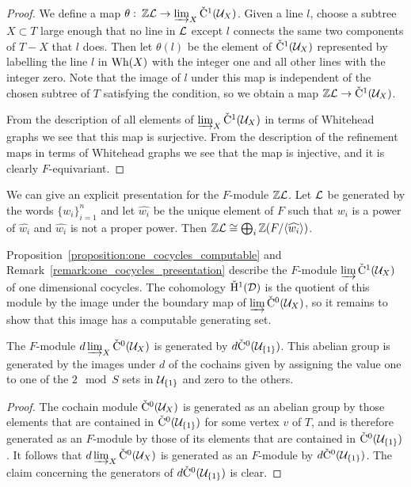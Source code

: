 \begin{proof}
  We define a map $\theta \operatorname{\colon}\mathbb{Z}\mathcal{L} \to \varinjlim_X\check{\mathrm{C}}{}^1(\mathcal{U}_X)$.
  Given a line $l$, choose a subtree $X\subset T$ large enough that no line in $\mathcal{L}$ except $l$ connects the same two components of $T - X$ that $l$ does.
  Then let $\theta(l)$ be the element of $\check{\mathrm{C}}{}^1(\mathcal{U}_X)$ represented by labelling the line $l$ in $\mathrm{Wh}(X)$ with the integer one and all other lines with the integer zero.
  Note that the image of $l$ under this map is independent of the chosen subtree of $T$ satisfying the condition, so we obtain a map $\mathbb{Z}\mathcal{L}\to\check{\mathrm{C}}{}^1(\mathcal{U}_X)$.

  From the description of all elements of $\varinjlim_X\check{\mathrm{C}}{}^1(\mathcal{U}_X)$ in terms of Whitehead graphs we see that this map is surjective.
  From the description of the refinement maps in terms of Whitehead graphs we see that the map is injective, and it is clearly $F$-equivariant.
\end{proof}

\begin{remark}\label{remark:one_cocycles_presentation}
  We can give an explicit presentation for the $F$-module $\mathbb{Z}\mathcal{L}$.
  Let $\mathcal{L}$ be generated by the words $\{w_i\}_{i=1}^n$ and let $\widehat{w_i}$ be the unique element of $F$ such that $w_i$ is a power of $\widehat{w_i}$ and $\widehat{w_i}$ is not a proper power.
  Then $\mathbb{Z}\mathcal{L} \cong \bigoplus_i \mathbb{Z} (F/ \langle \widehat{w_i}\rangle)$.
\end{remark}

Proposition~\ref{proposition:one_cocycles_computable} and Remark~\ref{remark:one_cocycles_presentation} describe the $F$-module $\varinjlim\check{\mathrm{C}}{}^1 (\mathcal{U}_X)$ of one dimensional cocycles.
The cohomology $\check{\mathrm{H}}{}^1( \mathcal{D})$ is the quotient of this module by the image under the boundary map of $\varinjlim\check{\mathrm{C}}{}^0(\mathcal{U}_X)$, so it remains to show that this image has a computable generating set.

\begin{lemma}\label{lemma:image}
  The $F$-module $d\varinjlim_X\check{\mathrm{C}}{}^0(\mathcal{U}_X)$ is generated by $d\check{\mathrm{C}}{}^0(\mathcal{U}_{\{1\}})$. This abelian group is generated by the images under $d$ of the cochains given by assigning the value one to one of the $2\mod{S}$ sets in $\mathcal{U}_{\{1\}}$ and zero to the others.
\end{lemma}

\begin{proof}
The cochain module $\check{\mathrm{C}}{}^0(\mathcal{U}_X)$ is generated as an abelian group by those elements that are contained in $\check{\mathrm{C}}{}^0(\mathcal{U}_{\{1\}})$ for some vertex $v$ of $T$, and is therefore generated as an $F$-module by those of its elements that are contained in $\check{\mathrm{C}}{}^0(\mathcal{U}_{\{1\}})$.
It follows that $d\varinjlim_X\check{\mathrm{C}}{}^0(\mathcal{U}_X)$ is generated as an $F$-module by $d\check{\mathrm{C}}{}^0(\mathcal{U}_{\{1\}})$.
The claim concerning the generators of $d\check{\mathrm{C}}{}^0(\mathcal{U}_{\{1\}})$ is clear.
\end{proof}

